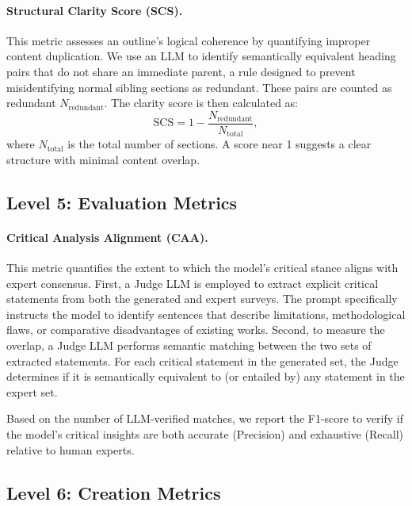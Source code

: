 \documentclass[11pt]{article}
\begin{document}
\paragraph{Structural Clarity Score (SCS).}
This metric assesses an outline's logical coherence by quantifying improper content duplication. We use an LLM to identify semantically equivalent heading pairs that do not share an immediate parent, a rule designed to prevent misidentifying normal sibling sections as redundant. These pairs are counted as redundant \(N_{\text{redundant}}\). The clarity score is then calculated as:
{
\setlength{\abovedisplayskip}{6pt}%
\setlength{\belowdisplayskip}{6pt}%
\begin{equation}
    \text{SCS} = 1 - \frac{N_{\text{redundant}}}{N_{\text{total}}},
\end{equation}
}
where \(N_{\text{total}}\) is the total number of sections. A score near 1 suggests a clear structure with minimal content overlap.

\subsection{Level 5: Evaluation Metrics}
\label{sec:app_l5}

\paragraph{Critical Analysis Alignment (CAA).}
This metric quantifies the extent to which the model's critical stance aligns with expert consensus. First, a Judge LLM is employed to extract explicit critical statements from both the generated and expert surveys. The prompt specifically instructs the model to identify sentences that describe limitations, methodological flaws, or comparative disadvantages of existing works. Second, to measure the overlap, a Judge LLM performs semantic matching between the two sets of extracted statements. For each critical statement in the generated set, the Judge determines if it is semantically equivalent to (or entailed by) any statement in the expert set.

Based on the number of LLM-verified matches, we report the F1-score to verify if the model's critical insights are both accurate (Precision) and exhaustive (Recall) relative to human experts. 

\subsection{Level 6: Creation Metrics}
\label{sec:app_l6}
\end{document}

